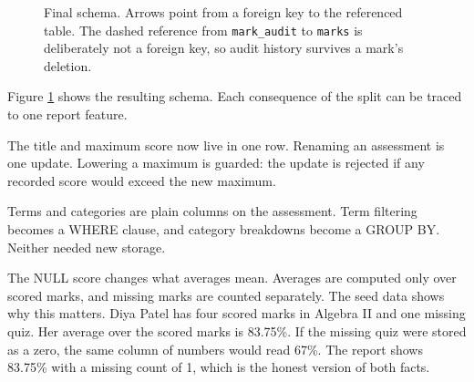 \documentclass[11pt,a4paper]{article}
\begin{document}
\begin{figure}[htbp]
\centering
{}
\caption{Final schema. Arrows point from a foreign key to the referenced table. The dashed reference from \texttt{mark\_audit} to \texttt{marks} is deliberately not a foreign key, so audit history survives a mark's deletion.}
\label{fig:schema}
\end{figure}

Figure \ref{fig:schema} shows the resulting schema. Each consequence of the split can be traced to one report feature.

The title and maximum score now live in one row. Renaming an assessment is one update. Lowering a maximum is guarded: the update is rejected if any recorded score would exceed the new maximum.

Terms and categories are plain columns on the assessment. Term filtering becomes a WHERE clause, and category breakdowns become a GROUP BY. Neither needed new storage.

The NULL score changes what averages mean. Averages are computed only over scored marks, and missing marks are counted separately. The seed data shows why this matters. Diya Patel has four scored marks in Algebra II and one missing quiz. Her average over the scored marks is 83.75\%. If the missing quiz were stored as a zero, the same column of numbers would read 67\%. The report shows 83.75\% with a missing count of 1, which is the honest version of both facts.
\end{document}

